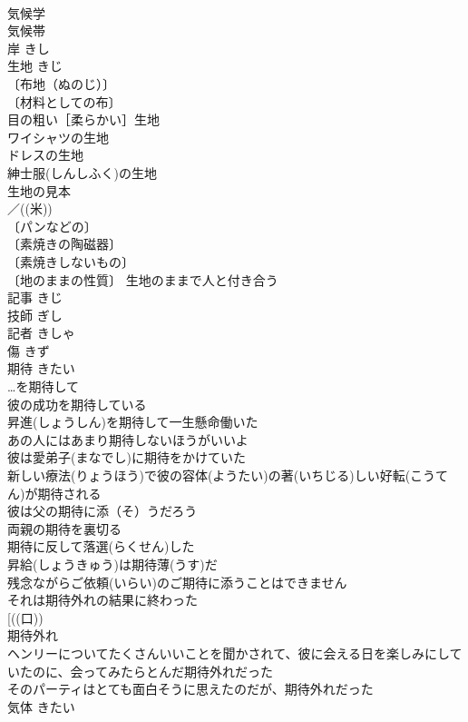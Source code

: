 \documentclass[8pt]{extreport}
\begin{document}
\begin{CJK}{UTF8}{min}
\\	気候学 
\\	気候帯 
\\	岸	きし	
\\	生地	きじ	
\\	〔布地（ぬのじ）〕
\\	〔材料としての布〕
\\	目の粗い［柔らかい］生地 
\\	ワイシャツの生地 
\\	ドレスの生地 
\\	紳士服(しんしふく)の生地 
\\	生地の見本 
\\	／((米)) 
\\	〔パンなどの〕
\\	〔素焼きの陶磁器〕
\\	〔素焼きしないもの〕
\\	〔地のままの性質〕 生地のままで人と付き合う 
\\	記事	きじ	
\\	技師	ぎし	
\\	記者	きしゃ	
\\	傷	きず	
\\	期待	きたい	
\\	…を期待して 
\\	彼の成功を期待している 
\\	昇進(しょうしん)を期待して一生懸命働いた 
\\	あの人にはあまり期待しないほうがいいよ 
\\	彼は愛弟子(まなでし)に期待をかけていた 
\\	新しい療法(りょうほう)で彼の容体(ようたい)の著(いちじる)しい好転(こうてん)が期待される 
\\	彼は父の期待に添（そ）うだろう 
\\	両親の期待を裏切る 
\\	期待に反して落選(らくせん)した 
\\	昇給(しょうきゅう)は期待薄(うす)だ 
\\	残念ながらご依頼(いらい)のご期待に添うことはできません 
\\	それは期待外れの結果に終わった 
\\	[((口)) 
\\	期待外れ 
\\	ヘンリーについてたくさんいいことを聞かされて、彼に会える日を楽しみにしていたのに、会ってみたらとんだ期待外れだった 
\\	そのパーティはとても面白そうに思えたのだが、期待外れだった 
\\	気体	きたい	

\end{CJK}
\end{document}
